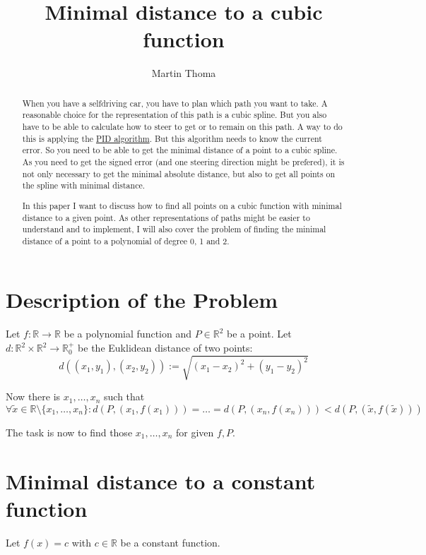 \documentclass[a4paper]{scrartcl}
\title{Minimal distance to a cubic function}
\author{Martin Thoma}
\def\mdr{\ensuremath{\mathbb{R}}}
\begin{document}
\maketitle
\begin{abstract}
When you have a selfdriving car, you have to plan which path you
want to take. A reasonable choice for the representation of this
path is a cubic spline. But you also have to be able to calculate
how to steer to get or to remain on this path. A way to do this
is applying the \href{https://en.wikipedia.org/wiki/PID_algorithm}{PID algorithm}.
But this algorithm needs to know the current error. So you need to 
be able to get the minimal distance of a point to a cubic spline.
As you need to get the signed error (and one steering direction might
be prefered), it is not only necessary to
get the minimal absolute distance, but also to get all points
on the spline with minimal distance.

In this paper I want to discuss how to find all points on a cubic 
function with minimal distance to a given point.
As other representations of paths might be easier to understand and
to implement, I will also cover the problem of finding the minimal
distance of a point to a polynomial of degree 0, 1 and 2.
\end{abstract}

\section{Description of the Problem}
Let $f: \mdr \rightarrow \mdr$ be a polynomial function and $P \in \mdr^2$
be a point. Let $d: \mdr^2 \times \mdr^2 \rightarrow \mdr_0^+$
be the Euklidean distance of two points:
\[d \left ((x_1, y_1), (x_2, y_2) \right) := \sqrt{(x_1 - x_2)^2 + (y_1 - y_2)^2}\]

Now there is  $x_1, \dots, x_n$ such that 
\[\forall \tilde x \in \mathbb{R} \setminus \{x_1, \dots, x_n\}: d(P, (x_1, f(x_1))) = \dots = d(P, (x_n, f(x_n))) < d(P, (\tilde x, f(\tilde x)))\]

The task is now to find those $x_1, \dots, x_n$ for given $f, P$.

\section{Minimal distance to a constant function}
Let $f(x) = c$ with $c \in \mdr$ be a constant function. 
\end{document}

